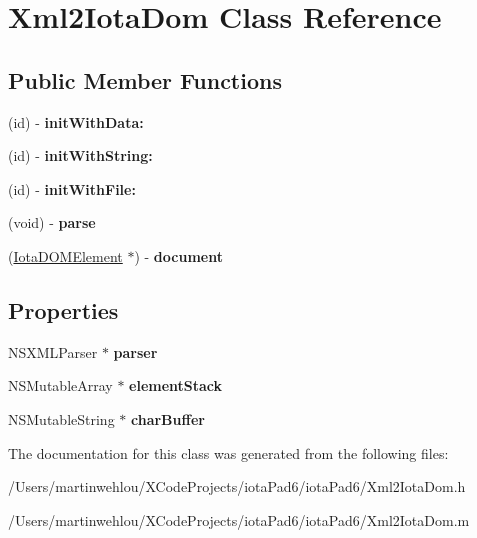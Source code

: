 \hypertarget{interface_xml2_iota_dom}{
\section{Xml2IotaDom Class Reference}
\label{interface_xml2_iota_dom}
}
\subsection*{Public Member Functions}
\begin{DoxyCompactItemize}
\item 
\hypertarget{interface_xml2_iota_dom_aafd14e2e16ae29717741fb8d70cfefef}{
(id) -\/ {\bfseries initWithData:}}
\label{interface_xml2_iota_dom_aafd14e2e16ae29717741fb8d70cfefef}

\item 
\hypertarget{interface_xml2_iota_dom_a9313568a19eebeb08c4f78296a5afd8b}{
(id) -\/ {\bfseries initWithString:}}
\label{interface_xml2_iota_dom_a9313568a19eebeb08c4f78296a5afd8b}

\item 
\hypertarget{interface_xml2_iota_dom_a1dd36fb6e43d6d51bf124c77dce0e8c3}{
(id) -\/ {\bfseries initWithFile:}}
\label{interface_xml2_iota_dom_a1dd36fb6e43d6d51bf124c77dce0e8c3}

\item 
\hypertarget{interface_xml2_iota_dom_a0e70b7c62c7995c96a46113e50109436}{
(void) -\/ {\bfseries parse}}
\label{interface_xml2_iota_dom_a0e70b7c62c7995c96a46113e50109436}

\item 
\hypertarget{interface_xml2_iota_dom_a87e6cf95af2b5d42f7c9dcf0b2aa1505}{
(\hyperlink{interface_iota_d_o_m_element}{IotaDOMElement} $\ast$) -\/ {\bfseries document}}
\label{interface_xml2_iota_dom_a87e6cf95af2b5d42f7c9dcf0b2aa1505}

\end{DoxyCompactItemize}
\subsection*{Properties}
\begin{DoxyCompactItemize}
\item 
\hypertarget{interface_xml2_iota_dom_aa88a6dea58ad7901b3f274a0a4390cc0}{
NSXMLParser $\ast$ {\bfseries parser}}
\label{interface_xml2_iota_dom_aa88a6dea58ad7901b3f274a0a4390cc0}

\item 
\hypertarget{interface_xml2_iota_dom_ac16c3db2c2ea1d178f4cdb57dac010f1}{
NSMutableArray $\ast$ {\bfseries elementStack}}
\label{interface_xml2_iota_dom_ac16c3db2c2ea1d178f4cdb57dac010f1}

\item 
\hypertarget{interface_xml2_iota_dom_ae78398fd253547bae152f68f233638dd}{
NSMutableString $\ast$ {\bfseries charBuffer}}
\label{interface_xml2_iota_dom_ae78398fd253547bae152f68f233638dd}

\end{DoxyCompactItemize}


The documentation for this class was generated from the following files:\begin{DoxyCompactItemize}
\item 
/Users/martinwehlou/XCodeProjects/iotaPad6/iotaPad6/Xml2IotaDom.h\item 
/Users/martinwehlou/XCodeProjects/iotaPad6/iotaPad6/Xml2IotaDom.m\end{DoxyCompactItemize}
